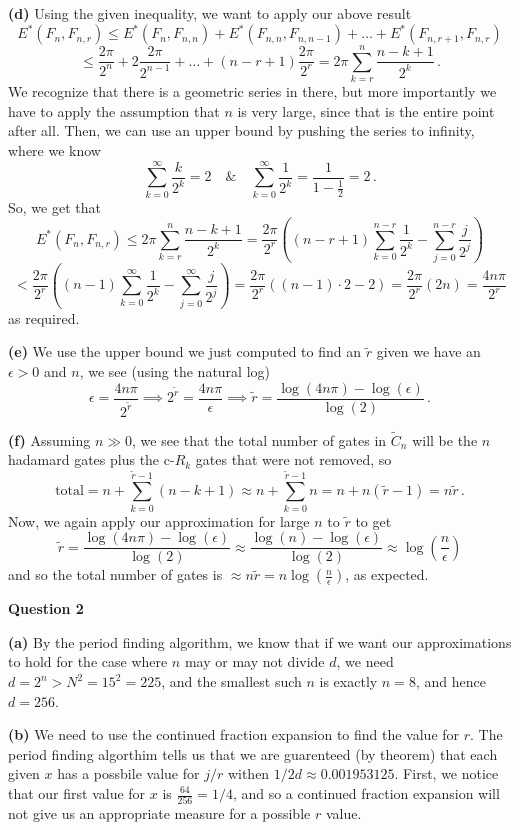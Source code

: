 \documentclass[10pt]{article}
\newcommand{\Que}[1]{\textbf{Question #1}}
\begin{document}
\textbf{(d)} Using the given inequality, we want to apply our above result
\[ E^{*}(F_{n},F_{n,r}) \leq E^{*}(F_{n},F_{n,n}) + E^{*}(F_{n,n},F_{n,n-1}) + \dots + E^{*}(F_{n,r+1},F_{n,r})\]
\[ \leq \frac{2\pi}{2^{n}} + 2\frac{2\pi}{2^{n-1}} + \dots +(n-r+1)\frac{2\pi}{2^{r}} = 2\pi\sum_{k=r}^{n}\frac{n-k+1}{2^{k}} \, .\]
We recognize that there is a geometric series in there, but more importantly we have to apply the assumption that $n$ is very large, since that is the entire point after all. Then, we can use an upper bound by pushing the series to infinity, where we know
\[ \sum_{k=0}^{\infty} \frac{k}{2^{k}} = 2 \quad \& \quad \sum_{k=0}^{\infty}\frac{1}{2^{k}} = \frac{1}{1 - \frac{1}{2}} = 2 \, .\]
So, we get that
\[ E^{*}(F_{n},F_{n,r}) \leq 2\pi\sum_{k=r}^{n}\frac{n-k+1}{2^{k}} = \frac{2\pi}{2^{r}}\left((n-r+1)\sum_{k=0}^{n-r}\frac{1}{2^{k}} - \sum_{j=0}^{n-r}\frac{j}{2^{j}}\right)\]
\[ < \frac{2\pi}{2^{r}}\left((n-1)\sum_{k=0}^{\infty}\frac{1}{2^{k}} - \sum_{j=0}^{\infty}\frac{j}{2^{j}}\right) = \frac{2\pi}{2^{r}}\left((n-1)\cdot 2 - 2\right) = \frac{2\pi}{2^{r}}(2n) = \frac{4n\pi}{2^{r}}\]
as required.

\textbf{(e)} We use the upper bound we just computed to find an $\tilde{r}$ given we have an $\epsilon > 0$ and $n$, we see (using the natural log)
\[ \epsilon = \frac{4n\pi}{2^{\tilde{r}}} \implies 2^{\tilde{r}} = \frac{4n\pi}{\epsilon} \implies \tilde{r} = \frac{\log(4n\pi) - \log(\epsilon)}{\log(2)}\, . \]

\textbf{(f)} Assuming $n \gg 0$, we see that the total number of gates in $\tilde{C}_{n}$ will be the $n$ hadamard gates plus the c-$R_{k}$ gates that were not removed, so
\[ \text{total} = n + \sum_{k=0}^{\tilde{r}-1}(n - k + 1) \approx n + \sum_{k=0}^{\tilde{r}-1}n = n + n(\tilde{r} - 1) = n\tilde{r} \, .\]
Now, we again apply our approximation for large $n$ to $\tilde{r}$ to get
\[ \tilde{r} = \frac{\log(4n\pi) - \log(\epsilon)}{\log(2)} \approx \frac{\log(n) - \log(\epsilon)}{\log(2)} \approx \log\left(\frac{n}{\epsilon}\right) \]
and so the total number of gates is $\approx n\tilde{r} = n\log\left(\frac{n}{\epsilon}\right)$, as expected. 

\newpage
\Que{2}

\textbf{(a)} By the period finding algorithm, we know that if we want our approximations to hold for the case where $n$ may or may not divide $d$, we need $d = 2^{n} > N^{2} = 15^{2} = 225$, and the smallest such $n$ is exactly $n=8$, and hence $d = 256$. 

\textbf{(b)} We need to use the continued fraction expansion to find the value for $r$. The period finding algorthim tells us that we are guarenteed (by theorem) that each given $x$ has a possbile value for $j/r$ withen $1/2d \approx 0.001953125$. First, we notice that our first value for $x$ is $\frac{64}{256} = 1/4$, and so a continued fraction expansion will not give us an appropriate measure for a possible $r$ value.
\end{document}

